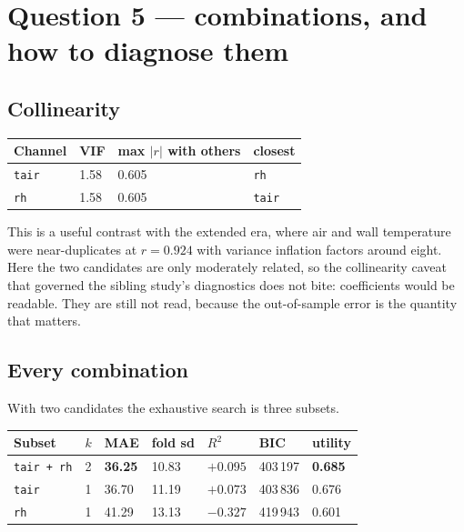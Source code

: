 \documentclass[11pt,a4paper]{article}
\begin{document}
\section{Question 5 --- combinations, and how to diagnose them}

\subsection{Collinearity}

\begin{center}
\small
\begin{tabular}{lR{1.6cm}R{2.6cm}l}
\toprule
\textbf{Channel} & \textbf{VIF} & \textbf{max $|r|$ with others} &
\textbf{closest} \\
\midrule
\texttt{tair} & 1.58 & 0.605 & \texttt{rh} \\
\texttt{rh}   & 1.58 & 0.605 & \texttt{tair} \\
\bottomrule
\end{tabular}
\end{center}

This is a useful contrast with the extended era, where air and wall temperature
were near-duplicates at $r = 0.924$ with variance inflation factors around eight.
Here the two candidates are only moderately related, so the collinearity caveat
that governed the sibling study's diagnostics does not bite: coefficients would
be readable. They are still not read, because the out-of-sample error is the
quantity that matters.

\subsection{Every combination}

With two candidates the exhaustive search is three subsets.

\begin{center}
\small
\begin{tabular}{lR{0.7cm}R{1.5cm}R{1.4cm}R{1.4cm}R{1.6cm}R{1.4cm}}
\toprule
\textbf{Subset} & \textbf{$k$} & \textbf{MAE} & \textbf{fold sd} &
\textbf{$R^2$} & \textbf{BIC} & \textbf{utility} \\
\midrule
\texttt{tair + rh} & 2 & \textbf{36.25} & 10.83 & $+0.095$ & 403\,197 & \textbf{0.685} \\
\texttt{tair}      & 1 & 36.70 & 11.19 & $+0.073$ & 403\,836 & 0.676 \\
\texttt{rh}        & 1 & 41.29 & 13.13 & $-0.327$ & 419\,943 & 0.601 \\
\bottomrule
\end{tabular}
\end{center}
\end{document}
